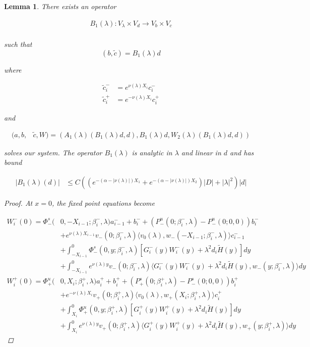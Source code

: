 \documentclass[12pt]{article}
\newtheorem{lemma}{Lemma}
\begin{document}

\begin{lemma}
There exists an operator

\begin{align*}
B_1(\lambda): V_\lambda \times V_d \rightarrow V_b \times V_c \\
\end{align*}

such that 
\[
(b, \tilde{c}) = B_1(\lambda)d
\]

where

\begin{align*}
\tilde{c}_i^- &= e^{\nu(\lambda)X_i} c_i^- \\
\tilde{c}_i^+ &= e^{-\nu(\lambda)X_i} c_i^+
\end{align*}

and

\begin{align*}
(a,b,&\tilde{c}, W) 
= (A_1(\lambda)(B_1(\lambda)d, d), B_1(\lambda)d, W_2(\lambda)(B_1(\lambda)d, d))
\end{align*}

solves our system. The operator $B_1(\lambda)$ is analytic in $\lambda$ and linear in $d$ and has bound

\begin{align*}
|B_1(\lambda)(d)| &\leq C ( (e^{-(\alpha - |\nu(\lambda)|) X_1} + e^{-(\alpha - |\nu(\lambda)|) X_2} ) |D| + |\lambda|^2 )|d|
\end{align*}

\begin{proof}

At $x = 0$, the fixed point equations become

\begin{align*}
W_i^-(0) = \Phi^s_-(&0, -X_{i-1}; \beta_i^-, \lambda)a_{i-1}^- + b_i^- + (P^u_-(0; \beta_i^-, \lambda) - P^u_-(0; 0, 0))b_i^- \\
&+ e^{\nu(\lambda)X_{i-1}} v_-(0; \beta_i^-, \lambda) \langle v_0(\lambda), w_-(-X_{i-1}; \beta_i^-, \lambda) \rangle c_{i-1}^- \\
&+ \int_{-X_{i-1}}^0 \Phi^s_-(0, y; \beta_i^-, \lambda) [ G_i^-(y)W_i^-(y) + \lambda^2 d_i \tilde{H}(y) ] dy \\
&+ \int_{-X_{i-1}}^0
e^{\nu(\lambda)y} v_-(0; \beta_i^-, \lambda) \langle G_i^-(y)W_i^-(y) + \lambda^2 d_i \tilde{H}(y), w_-(y; \beta_i^-, \lambda) \rangle dy \\
W_i^+(0) = \Phi^u_+(&0, X_i; \beta_i^+, \lambda)a_i^+ + b_i^+ + (P^s_+(0; \beta_i^+, \lambda) - P^s_-(0; 0, 0))b_i^+ \\
&+ e^{-\nu(\lambda) X_i} v_+(0; \beta_i^+, \lambda) \langle v_0(\lambda), w_+(X_i; \beta_i^+, \lambda) \rangle c_i^+ \\
&+ \int_{X_i}^0 \Phi^u_+(0, y; \beta_i^+, \lambda) [ G_i^+(y)W_i^+(y) + \lambda^2 d_i \tilde{H}(y) ] dy \\
&+ \int_{X_i}^0 e^{\nu(\lambda)y} v_+(0; \beta_i^+, \lambda) \langle G_i^+(y)W_i^+(y) + \lambda^2 d_i \tilde{H}(y), w_+(y; \beta_i^+, \lambda) \rangle dy
\end{align*}


\end{proof}
\end{lemma}
\end{document}
